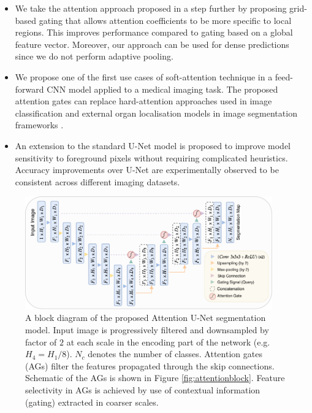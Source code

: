 \documentclass{article}
\begin{document}
\begin{itemize}
	
	\item We take the attention approach proposed in \cite{jetley2018learn} a step further by proposing grid-based gating that allows attention coefficients to be more specific to local regions. This improves performance compared to gating based on a global feature vector. Moreover, our approach can be used for dense predictions since we do not perform adaptive pooling.  
	
	\item We propose one of the first use cases of soft-attention technique in a feed-forward CNN model applied to a medical imaging task. The proposed attention gates can replace hard-attention approaches used in image classification \cite{ypsilantis2017learning} and external organ localisation models in image segmentation frameworks \cite{khened2018fully, oda20173d, roth2018media, roth2017hierarchical}. 
	
	\item An extension to the standard U-Net model is proposed to improve model sensitivity to foreground pixels without requiring complicated heuristics. Accuracy improvements over U-Net are experimentally observed to be consistent across different imaging datasets. 
\end{itemize}

\begin{figure}[!t]
	\centering
	\includegraphics[width=0.95\textwidth]{figure4.pdf}
	\caption{A block diagram of the proposed Attention U-Net segmentation model. Input image is progressively filtered and downsampled by factor of $2$ at each scale in the encoding part of the network (e.g. $H_4=H_1/8$). $N_c$ denotes the number of classes. Attention gates (AGs) filter the features propagated through the skip connections. Schematic of the AGs is shown in Figure \ref{fig:attentionblock}. Feature selectivity in AGs is achieved by use of contextual information (gating) extracted in coarser scales.}
	\label{fig:modelschematic}
\end{figure}
\end{document}
